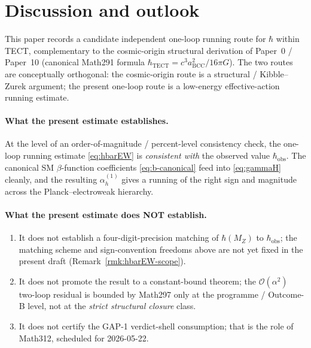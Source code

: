 \section{Discussion and outlook}\label{sec:discussion}

This paper records a candidate independent one-loop running route
for $\hbar$ within TECT, complementary to the cosmic-origin
structural derivation of Paper~0 / Paper~10 (canonical Math291
formula
$\hbar_{\mathrm{TECT}} = c^3 a_{\mathrm{BCC}}^2 / 16\pi G$).
The two routes are conceptually orthogonal: the cosmic-origin route
is a structural / Kibble--Zurek argument; the present one-loop
route is a low-energy effective-action running estimate.

\paragraph{What the present estimate establishes.}
At the level of an order-of-magnitude / percent-level consistency
check, the one-loop running estimate \eqref{eq:hbarEW} is
\emph{consistent with} the observed value $\hbar_{\mathrm{obs}}$. The
canonical SM $\beta$-function coefficients \eqref{eq:b-canonical} feed
into \eqref{eq:gammaH} cleanly, and the resulting $\alpha_h^{(1)}$
gives a running of the right sign and magnitude across the
Planck--electroweak hierarchy.

\paragraph{What the present estimate does NOT establish.}
\begin{enumerate}
  \item It does not establish a four-digit-precision matching of
    $\hbar(M_Z)$ to $\hbar_{\mathrm{obs}}$; the matching scheme and
    sign-convention freedoms above are not yet fixed in the present
    draft (Remark~\ref{rmk:hbarEW-scope}).
  \item It does not promote the result to a constant-bound theorem;
    the $\mathcal{O}(\alpha^2)$ two-loop residual is bounded by
    Math297 only at the programme / Outcome-B level, not at the
    \emph{strict structural closure} class.
  \item It does not certify the GAP-1 verdict-shell consumption;
    that is the role of Math312, scheduled for 2026-05-22.
\end{enumerate}

